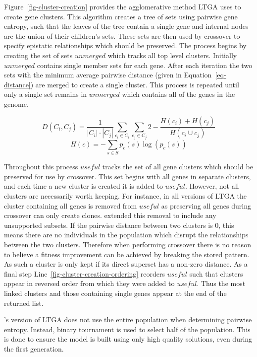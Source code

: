Figure~\ref{fig-cluster-creation} provides the agglomerative method LTGA uses to create gene clusters.
This algorithm creates a tree of sets using pairwise gene entropy, such that the leaves of the tree contain a single gene and
internal nodes are the union of their children's sets. These sets are then used by crossover to specify epistatic
relationships which should be preserved.
The process begins by creating the set of sets $unmerged$ which tracks all top level clusters. Initially
$unmerged$ contains single member sets for each gene. After each iteration the two sets with the minimum average pairwise
distance (given in Equation~\ref{eq-distance}) are merged to create a single cluster. This process is repeated
until only a single set remains in $unmerged$ which contains all of the genes in the genome.

\begin{equation}
  D(C_i,C_j) = \frac{1}{\left | C_i \right |\cdot \left |C_j \right|}\sum_{c_i \in C_i}\sum_{c_j \in C_j}
  2 - \frac{H(c_i) + H(c_j)}{H(c_i \cup c_j)}
  \label{eq-distance}
\end{equation}
\begin{equation}
  H(c) = -\sum_{s\in S} p_c(s)\log(p_c(s))
  \label{eq-entropy}
\end{equation}

Throughout this process $useful$ tracks the set of all gene clusters which should be preserved for use by crossover.
This set begins with all genes in separate clusters, and each time a new cluster is created it is added to $useful$.
However, not all clusters are necessarily worth keeping. For instance, in all versions of LTGA the cluster
containing all genes is removed from $useful$ as preserving all genes during crossover can only create clones.
\cite{thierens:2013:ltgahiff} extended this removal to include any unsupported subsets. If the pairwise distance
between two clusters is 0, this means there are no individuals in the population which disrupt the relationships between the two
clusters. Therefore when performing crossover there is no reason to believe a fitness improvement can be achieved
by breaking the stored pattern. As such a cluster is only kept if its direct superset has a non-zero distance.
As a final step Line~\ref{fig-cluster-creation-ordering} reorders $useful$ such that clusters appear in reversed
order from which they were added to $useful$. Thus the most linked clusters and those containing single genes
appear at the end of the returned list.

\cite{thierens:2013:ltgahiff}'s version of LTGA does not use the entire population when determining pairwise entropy.
Instead, binary tournament is used to select half of the population. This is done to ensure the model is built
using only high quality solutions, even during the first generation.

